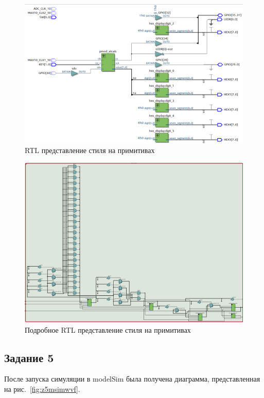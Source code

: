 \documentclass[a4paper,14pt]{article}
\begin{document}
	\begin{figure}[H]
		\centering
		\includegraphics[width=0.9\linewidth]{images/9_4_rtl}
		\caption{RTL представление стиля на примитивах}
		\label{fig:9_4_rtl}
	\end{figure}
	
	\begin{figure}[H]
		\centering
		\includegraphics[width=0.9\linewidth]{images/9_4_rtl2}
		\caption{Подробное RTL представление стиля на примитивах}
		\label{fig:9_4_rtl2}
	\end{figure}

	\subsection{Задание 5}
	
	После запуска симуляции в modelSim была получена диаграмма, представленная на рис.~\ref{fig:z5msimwvf}.
	
\end{document}
